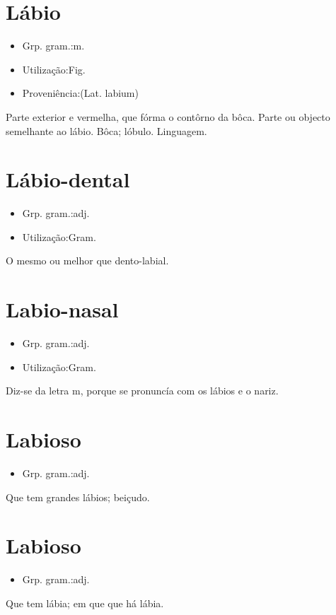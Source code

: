 \section{Lábio}
\begin{itemize}
\item {Grp. gram.:m.}
\end{itemize}
\begin{itemize}
\item {Utilização:Fig.}
\end{itemize}
\begin{itemize}
\item {Proveniência:(Lat. \textunderscore labium\textunderscore )}
\end{itemize}
Parte exterior e vermelha, que fórma o contôrno da bôca.
Parte ou objecto semelhante ao lábio.
Bôca; lóbulo.
Linguagem.
\section{Lábio-dental}
\begin{itemize}
\item {Grp. gram.:adj.}
\end{itemize}
\begin{itemize}
\item {Utilização:Gram.}
\end{itemize}
O mesmo ou melhor que \textunderscore dento-labial\textunderscore .
\section{Labio-nasal}
\begin{itemize}
\item {Grp. gram.:adj.}
\end{itemize}
\begin{itemize}
\item {Utilização:Gram.}
\end{itemize}
Diz-se da letra \textunderscore m\textunderscore , porque se pronuncía com os lábios e o nariz.
\section{Labioso}
\begin{itemize}
\item {Grp. gram.:adj.}
\end{itemize}
Que tem grandes lábios; beiçudo.
\section{Labioso}
\begin{itemize}
\item {Grp. gram.:adj.}
\end{itemize}
Que tem lábia; em que que há lábia.

